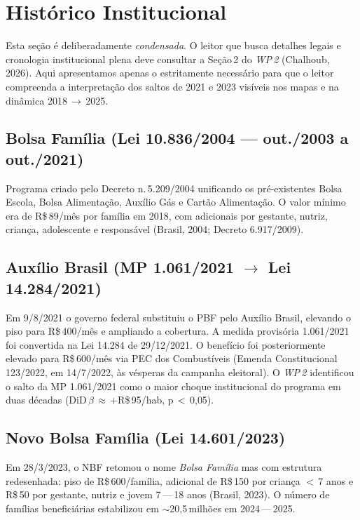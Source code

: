 \documentclass[12pt,a4paper,oneside]{article}
\newcommand{\rs}{R\$\,}
\begin{document}
\section{Histórico Institucional}\label{sec:historico}

Esta seção é deliberadamente \textit{condensada}. O leitor que busca
detalhes legais e cronologia institucional plena deve consultar a Seção\,2
do \textit{WP\,2} (Chalhoub, 2026). Aqui apresentamos apenas o estritamente
necessário para que o leitor compreenda a interpretação dos saltos
de 2021 e 2023 visíveis nos mapas e na dinâmica 2018\,$\rightarrow$\,2025.

\subsection{Bolsa Família (Lei 10.836/2004 — out./2003 a out./2021)}
Programa criado pelo Decreto n.\,5.209/2004 unificando os pré-existentes
Bolsa Escola, Bolsa Alimentação, Auxílio Gás e Cartão Alimentação. O valor
mínimo era de \rs 89/mês por família em 2018, com adicionais por gestante,
nutriz, criança, adolescente e responsável (Brasil, 2004; Decreto
6.917/2009).

\subsection{Auxílio Brasil (MP 1.061/2021 $\rightarrow$ Lei 14.284/2021)}
Em 9/8/2021 o governo federal substituiu o PBF pelo Auxílio Brasil,
elevando o piso para \rs 400/mês e ampliando a cobertura. A medida
provisória 1.061/2021 foi convertida na Lei 14.284 de 29/12/2021. O
benefício foi posteriormente elevado para \rs 600/mês via PEC dos
Combustíveis (Emenda Constitucional 123/2022, em 14/7/2022,
às vésperas da campanha eleitoral). O \textit{WP\,2} identificou o salto
da MP 1.061/2021 como o maior choque institucional do programa em duas
décadas (DiD\,$\beta$\,$\approx$\,+\rs 95/hab, p\,$<$\,0{,}05).

\subsection{Novo Bolsa Família (Lei 14.601/2023)}
Em 28/3/2023, o NBF retomou o nome \textit{Bolsa Família} mas com
estrutura redesenhada: piso de \rs 600/família, adicional de \rs 150 por
criança $<$\,7 anos e \rs 50 por gestante, nutriz e jovem 7\,---\,18 anos
(Brasil, 2023). O número de famílias beneficiárias estabilizou em
$\sim$20{,}5\,milhões em 2024\,---\,2025.
\end{document}
